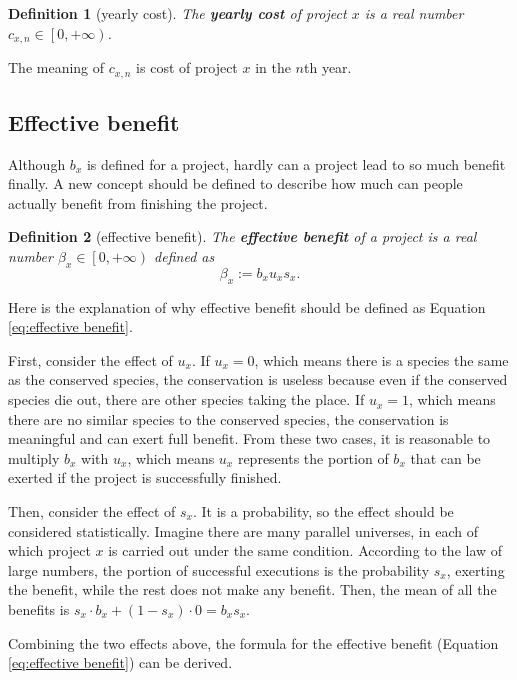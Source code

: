 \documentclass{article}
\newtheorem{definition}{Definition}
\begin{document}
\begin{definition}[yearly cost]
The \textbf{yearly cost} of project $x$ is a real number $c_{x,n}\in\left[0,+\infty\right)$.
\end{definition}

The meaning of $c_{x,n}$ is cost of project $x$ in the $n$th year.

\subsection{Effective benefit}
\label{sec:effective benefit}

Although $b_x$ is defined for a project, hardly can a project lead to so much benefit finally.
A new concept should be defined to describe how much can people actually benefit from finishing the project.

\begin{definition}[effective benefit]
The \textbf{effective benefit} of a project is a real number $\beta_x\in\left[0,+\infty\right)$ defined as
\begin{equation}
\label{eq:effective benefit}
\beta_x:=b_xu_xs_x.
\end{equation}
\end{definition}

Here is the explanation of why effective benefit should be defined as Equation \ref{eq:effective benefit}.

First, consider the effect of $u_x$.
If $u_x=0$, which means there is a species the same as the conserved species,
the conservation is useless because even if the conserved species die out, there are other species taking the place.
If $u_x=1$, which means there are no similar species to the conserved species,
the conservation is meaningful and can exert full benefit.
From these two cases, it is reasonable to multiply $b_x$ with $u_x$,
which means $u_x$ represents the portion of $b_x$ that can be exerted if the project is successfully finished.

Then, consider the effect of $s_x$.
It is a probability, so the effect should be considered statistically.
Imagine there are many parallel universes, in each of which project $x$ is carried out under the same condition.
According to the law of large numbers, the portion of successful executions is the probability $s_x$, exerting the benefit,
while the rest does not make any benefit.
Then, the mean of all the benefits is $s_x\cdot b_x+\left(1-s_x\right)\cdot0=b_xs_x$.

Combining the two effects above, the formula for the effective benefit (Equation \ref{eq:effective benefit}) can be derived.
\end{document}
